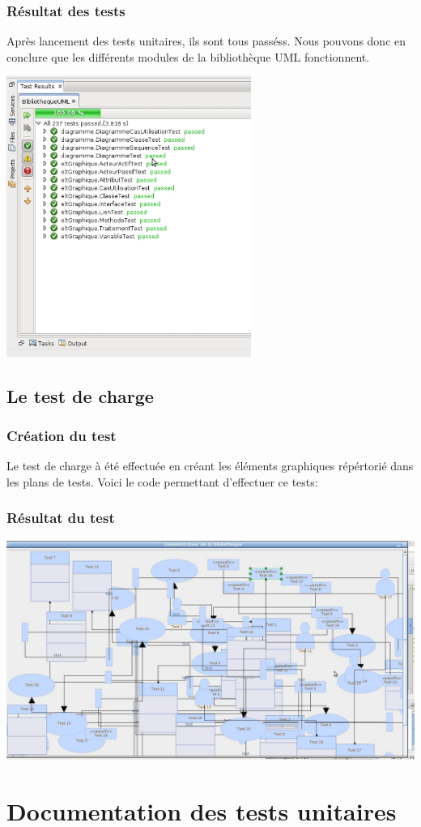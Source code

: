 \documentclass[12pt,a4paper,openany]{report}
\begin{document}
	\subsection{Résultat des tests}
	Après lancement des tests unitaires, ils sont tous passéss. Nous pouvons donc en conclure que les différents modules de la bibliothèque UML fonctionnent. 
	\begin{center} \includegraphics[width=8cm]{junitPassed.jpg} \end{center}
		\newpage
	\section{Le test de charge}
	\subsection{Création du test}
	Le test de charge à été effectuée en créant les éléments graphiques répértorié dans les plans de tests. Voici le code permettant d'effectuer ce tests:
	
	\subsection{Résultat du test}
	\includegraphics[width=25cm, angle=90]{testCharge.jpg}
	\appendix	
	\chapter{Documentation des tests unitaires}
	\label{junitdoc}
	
\end{document}
